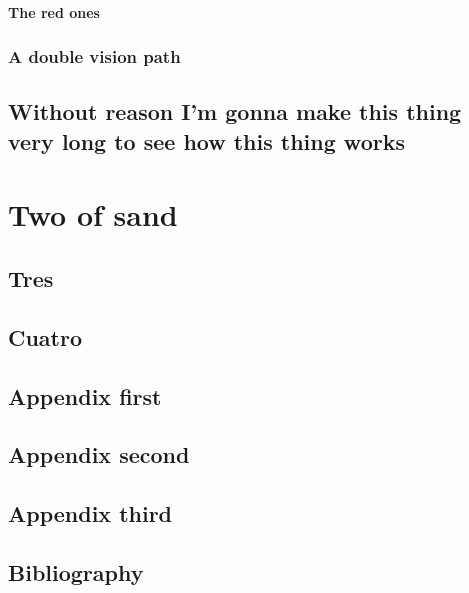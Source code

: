 \documentclass[draft]{qx-files/qx-book}
\begin{document}
\subsection{The red ones}

\lipsum[1-2]

\section{A double vision path}

\lipsum

\chapter[Título largo]{Without reason I'm gonna make this thing very long to see how this thing works}
\lipsum


\part{Two of sand}

\chapter{Tres}
\lipsum


\chapter{Cuatro}
\lipsum[1]

\appendix

\chapter{Appendix first}


\lipsum[1]

\chapter{Appendix second}


\lipsum[1]

\chapter{Appendix third}


\lipsum[1]

\backmatter

\chapter{Bibliography}

\lipsum
\end{document}
